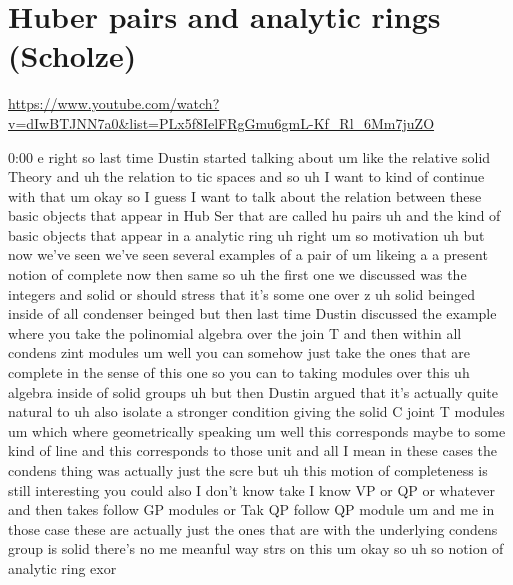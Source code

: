 
\section{\ufs Huber pairs and analytic rings (Scholze)}

\url{https://www.youtube.com/watch?v=dIwBTJNN7a0&list=PLx5f8IelFRgGmu6gmL-Kf_Rl_6Mm7juZO}
\renewcommand{\yt}[2]{\href{https://www.youtube.com/watch?v=dIwBTJNN7a0&list=PLx5f8IelFRgGmu6gmL-Kf_Rl_6Mm7juZO&t=#1}{#2}}
\vspace{1em}

\begin{unfinished}{0:00}
e
right  so  last  time  Dustin  started
talking  about  um  like  the  relative  solid
Theory  and  uh  the  relation  to  tic  spaces
and  so  uh  I  want  to  kind  of  continue
with  that  um  okay  so  I  guess  I  want  to
talk  about  the  relation  between  these
basic  objects  that  appear  in  Hub  Ser
that  are  called  hu
pairs
uh  and  the  kind  of  basic  objects  that
appear  in  a
analytic
ring
uh  right  um  so
motivation
uh  but  now  we've  seen  we've  seen  several
examples
of  a
pair  of
um
likeing
a  a  present  notion  of
complete  now  then
same  so  uh  the  first  one  we  discussed
was  the
integers
and  solid  or  should  stress  that  it's
some  one  over  z  uh  solid  beinged  inside
of  all  condenser
beinged  but  then  last  time  Dustin
discussed  the  example  where  you  take  the
polinomial  algebra  over  the  join  T  and
then  within
all  condens  zint
modules  um  well  you  can  somehow  just
take  the  ones  that  are  complete  in  the
sense  of  this  one  so  you  can  to  taking
modules  over  this  uh  algebra  inside
of  solid
groups
uh  but  then  Dustin  argued  that  it's
actually  quite  natural  to
uh  also  isolate  a  stronger  condition
giving  the  solid  C  joint  T  modules  um
which  where  geometrically  speaking  um
well  this  corresponds  maybe  to  some  kind
of  line  and  this  corresponds  to  those
unit  and  all  I  mean  in  these  cases  the
condens  thing  was  actually  just  the  scre
but
uh  this  motion  of  completeness  is  still
interesting  you  could  also  I  don't  know
take  I  know  VP  or  QP  or  whatever  and
then  takes  follow  GP
modules  or  Tak  QP  follow  QP
module
um  and  me  in  those  case  these  are
actually  just  the  ones  that  are  with  the
underlying  condens  group  is
solid  there's  no  me  meanful  way  strs  on
this
um  okay
so  uh  so  notion  of  analytic  ring  exor

\end{unfinished}
